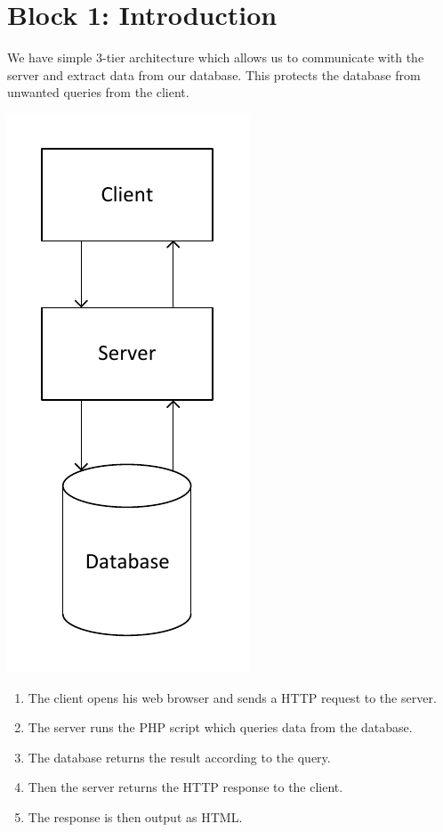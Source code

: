 \section{Block 1: Introduction}
We have simple 3-tier architecture which allows us to communicate with the server and extract data from our database. This protects the database from unwanted queries from the client.

\begin{center}
\includegraphics[scale=0.8]{3-tier.pdf}
\end{center}

\begin{enumerate}
\item The client opens his web browser and sends a HTTP request to the server.
\item The server runs the PHP script which queries data from the database.
\item The database returns the result according to the query.
\item Then the server returns the HTTP response to the client.
\item The response is then output as HTML.
\end{enumerate}

